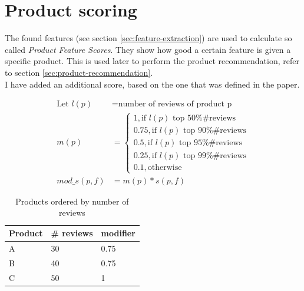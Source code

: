 \section{Product scoring}
\label{sec:product-scoring}
The found features (see section \ref{sec:feature-extraction}) are used to calculate so called \textit{Product Feature Scores}. They show how good a certain feature is given a specific product. This is used later to perform the product recommendation, refer to section \ref{sec:product-recommendation}.\\

I have added an additional score, based on the one that was defined in the paper.\\
\begin{minipage}{0.6\textwidth}
   \begin{align}
        \text{Let } l(p) &= \text{number of reviews of product p}\\
        m(p) &= 
        \begin{cases}
            1, \text{if } l(p) \text{ top 50\% \# reviews}\\
            0.75, \text{if } l(p) \text{ top 90\% \# reviews}\\
            0.5, \text{if } l(p) \text{ top 95\% \# reviews}\\
            0.25, \text{if } l(p) \text{ top 99\% \# reviews}\\
            0.1, \text{otherwise}
        \end{cases}\\
        mod\_s(p, f) &= m(p) * s(p, f)
    \end{align} 
\end{minipage}
\begin{minipage}{0.4\textwidth}
    \begin{table}[H]
    \centering
    \caption{Products ordered by number of reviews}
    \label{table:score-example}
    \begin{tabular}{l|l|l}
        Product & \# reviews & modifier \\ \hline
        A & 30 & 0.75\\
        B & 40 & 0.75\\
        C & 50 & 1
    \end{tabular}
    \end{table}
\end{minipage}

